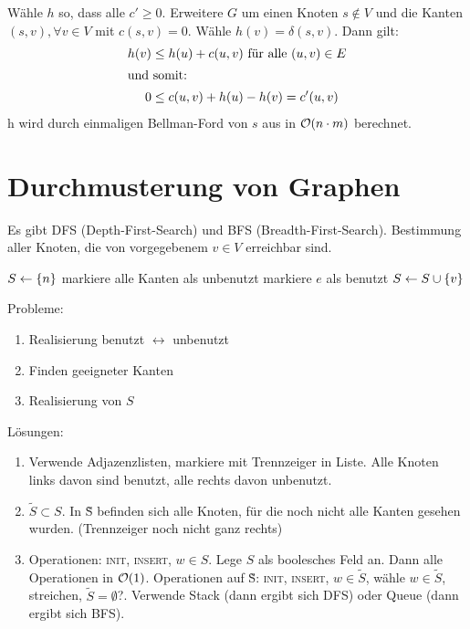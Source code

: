             Wähle $h$ so, dass alle $c' \ge 0$. Erweitere $G$ um einen Knoten $s \not\in V$ und
            die Kanten $(s, v), \forall v \in V$ mit $c(s, v) = 0$.
            Wähle $h(v) = \delta(s, v)$. Dann gilt:
            \begin{align*}
                h(v) &\le h(u) + c(u, v) \text{ für alle } (u, v) \in E \\
                \intertext{und somit:}
                0 &\le c(u, v) + h(u) - h(v) = c'(u, v)
            \end{align*}
            h wird durch einmaligen Bellman-Ford von $s$ aus in $\mathcal{O}(n \cdot m)$ berechnet.




        \section{Durchmusterung von Graphen}
        Es gibt DFS (Depth-First-Search) und BFS (Breadth-First-Search).
        Bestimmung aller Knoten, die von vorgegebenem $v \in V$ erreichbar sind.
        \begin{algorithmic}
        		\State $S\gets \{n\}$
        		\State markiere alle Kanten als unbenutzt
        			\State markiere $e$ als benutzt
        			\State $S\gets S\cup \{v\}$
        		\EndWhile
        \end{algorithmic}
        Probleme:
        \begin{enumerate}
            \item Realisierung benutzt $\leftrightarrow$ unbenutzt
            \item Finden geeigneter Kanten
            \item Realisierung von $S$
        \end{enumerate}

        Lösungen:
        \begin{enumerate}
            \item Verwende Adjazenzlisten, markiere mit Trennzeiger in Liste. %
                  Alle Knoten links davon sind benutzt, alle rechts davon unbenutzt.
            \item $\tilde S \subset S$. In \~S befinden sich alle Knoten, für die noch nicht alle Kanten gesehen wurden. (Trennzeiger noch nicht ganz rechts)
            \item Operationen: \textsc{init, insert}, $w \in S$. Lege $S$ als boolesches Feld an. Dann alle Operationen in $\mathcal{O}(1)$.
                Operationen auf \~S: \textsc{init, insert}, $w \in \tilde S$, wähle $w \in \tilde S$, streichen, $\tilde S = \emptyset$?. Verwende Stack (dann ergibt sich DFS) oder Queue (dann ergibt sich BFS).
        \end{enumerate}
        

